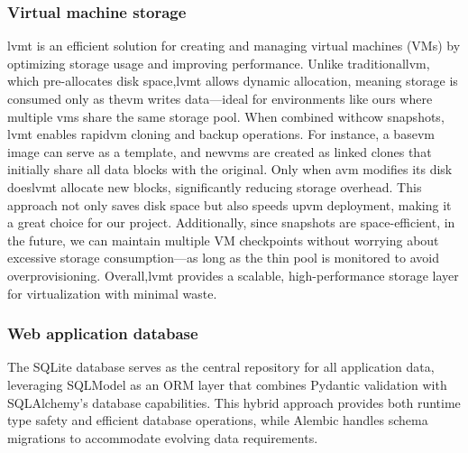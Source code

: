         \subsubsection{Virtual machine storage}

            \ac{lvmt} is an efficient solution for creating and managing virtual machines (VMs) by optimizing storage usage and improving performance. Unlike 
            traditional\ac{lvm}, which pre-allocates disk space,\ac{lvmt} allows dynamic allocation, meaning storage is consumed only as the\ac{vm} writes 
            data—ideal for environments like ours where multiple \ac{vm}s share the same storage pool. When combined with\ac{cow} snapshots, \ac{lvmt} enables 
            rapid\ac{vm} cloning and backup operations. For instance, a base\ac{vm} image can serve as a template, and new\ac{vm}s are created as linked 
            clones that initially share all data blocks with the original. Only when a\ac{vm} modifies its disk does\ac{lvmt} allocate new blocks, 
            significantly reducing storage overhead. This approach not only saves disk space but also speeds up\ac{vm} deployment, making it a great choice for 
            our project. Additionally, since snapshots are space-efficient, in the future, we can maintain multiple VM checkpoints without worrying about excessive 
            storage consumption—as long as the thin pool is monitored to avoid overprovisioning. Overall,\ac{lvmt} provides a scalable, high-performance storage 
            layer for virtualization with minimal waste.

        \subsubsection{Web application database}

            The SQLite database serves as the central repository for all application data, leveraging SQLModel as an ORM layer that combines Pydantic 
            validation with SQLAlchemy's database capabilities. This hybrid approach provides both runtime type safety and efficient database operations, 
            while Alembic handles schema migrations to accommodate evolving data requirements.


